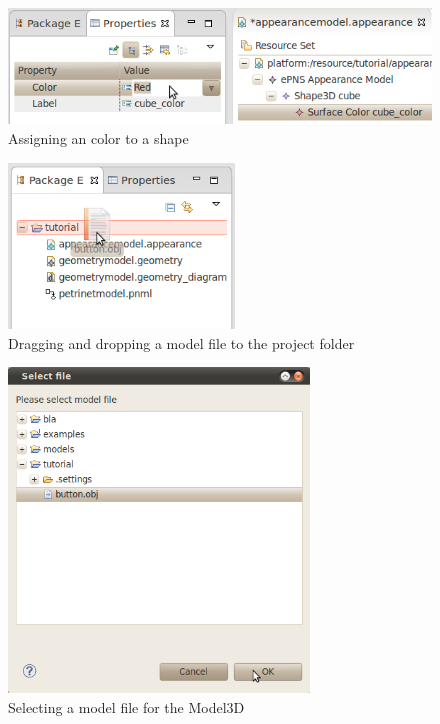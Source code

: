\begin{figure}[htp]
\begin{center}
  \includegraphics[width=12.0cm]{image/tutorial/Tutorial_11.png}
  \caption{Assigning an color to a shape}
  \label{fig:tut11}
\end{center}
\end{figure}

\begin{figure}[htp]
\begin{center}
  \includegraphics[width=6.0cm]{image/tutorial/Tutorial_12.png}
  \caption{Dragging and dropping a model file to the project folder}
  \label{fig:tut12}
\end{center}
\end{figure}

\begin{figure}[htp]
\begin{center}
  \includegraphics[width=8.0cm]{image/tutorial/Tutorial_13.png}
  \caption{Selecting a model file for the Model3D}
  \label{fig:tut13}
\end{center}
\end{figure}

